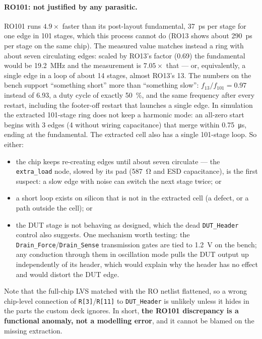 \documentclass[10pt,a4paper]{article}
\begin{document}
\paragraph{RO101: not justified by any parasitic.} RO101 runs $4.9\times$ faster than its post-layout
fundamental, \SI{37}{ps} per stage for one edge in 101 stages, which this process cannot do (RO13 shows
about \SI{290}{ps} per stage on the same chip). The measured value matches instead a ring with
about seven circulating edges: scaled by RO13's factor (0.69) the fundamental would be \SI{19.2}{MHz} and
the measurement is $7.05\times$ that --- or, equivalently, a single edge in a loop of about 14 stages,
almost RO13's 13. The numbers on the bench support ``something short'' more than ``something slow'':
$f_{13}/f_{101} = 0.97$ instead of 6.93, a duty cycle of exactly \SI{50}{\percent}, and the same frequency
after every restart, including the footer-off restart that launches a single edge. In simulation the
extracted 101-stage ring does not keep a harmonic mode: an all-zero start begins with 3 edges (4 without
wiring capacitance) that merge within \SI{0.75}{\micro s}, ending at the fundamental. The extracted cell
also has a single 101-stage loop. So either:
\begin{itemize}
  \item the chip keeps re-creating edges until about seven circulate --- the \texttt{extra\_load} node, slowed
        by its pad (\SI{587}{\ohm} and ESD capacitance), is the first suspect: a slow edge with noise can
        switch the next stage twice; or
  \item a short loop exists on silicon that is not in the extracted cell (a defect, or a path outside the
        cell); or
  \item the DUT stage is not behaving as designed, which the dead \texttt{DUT\_Header} control also
        suggests. One mechanism worth testing: the \texttt{Drain\_Force}/\texttt{Drain\_Sense} transmission
        gates are tied to \SI{1.2}{V} on the bench; any conduction through them in oscillation mode pulls the
        DUT output up independently of its header, which would explain why the header has no effect and would
        distort the DUT edge.
\end{itemize}
Note that the full-chip LVS matched with the RO netlist flattened, so a wrong chip-level connection of
\texttt{R[3]}/\texttt{R[11]} to \texttt{DUT\_Header} is unlikely unless it hides in the parts the
custom deck ignores. In short, \textbf{the RO101 discrepancy is a
functional anomaly, not a modelling error}, and it cannot be blamed on the missing extraction.
\end{document}
